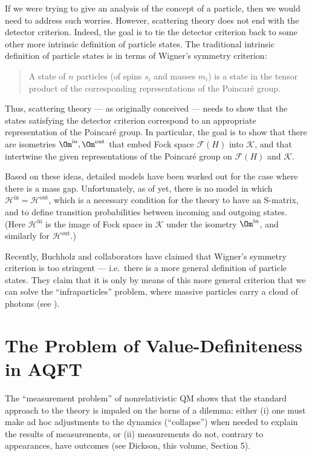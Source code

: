 \documentclass[11pt]{article}
\theoremstyle{definition}
\theoremstyle{definition}
\theoremstyle{remark}
\def\2#1{{\mathcal #1}}
\begin{document}
If we were trying to give an analysis of the concept of a particle,
then we would need to address such worries.  However, scattering
theory does not end with the detector criterion.  Indeed, the goal is
to tie the detector criterion back to some other more intrinsic
definition of particle states.  The traditional intrinsic definition
of particle states is in terms of Wigner's symmetry criterion:
\begin{quote} A state of $n$ particles (of spins $s_i$
  and masses $m_i$) is a state in the tensor product of
  the corresponding representations of the Poincar{\'e}
  group.  \end{quote} Thus, scattering theory --- as
originally conceived --- needs to show that the states
satisfying the detector criterion correspond to an
appropriate representation of the Poincar{\'e} group.
In particular, the goal is to show that there are
isometries $\Om ^{\mathrm{in}},\Om ^{\mathrm{out}}$
that embed Fock space $\2F (H)$ into $\2K$, and that
intertwine the given representations of the
Poincar{\'e} group on $\2F (H)$ and $\2K$.

Based on these ideas, detailed models have been worked
out for the case where there is a mass gap.
Unfortunately, as of yet, there is no model in which
$\2H ^{\mathrm{in}}=\2H ^{\mathrm{out}}$, which is a
necessary condition for the theory to have an S-matrix,
and to define transition probabilities between incoming
and outgoing states.  (Here $\2H ^{\mathrm{in}}$ is the
image of Fock space in $\2K$ under the isometry $\Om
^{\mathrm{in}}$, and similarly for $\2H
^{\mathrm{out}}$.)

Recently, Buchholz and collaborators have claimed that Wigner's
symmetry criterion is too stringent --- i.e.\ there is a more general
definition of particle states.  They claim that it is only by means of
this more general criterion that we can solve the ``infraparticles''
problem, where massive particles carry a cloud of photons (see
\cite{buc-por}).


\bigskip {}


\section{The Problem of Value-Definiteness in AQFT} \label{modal}

The ``measurement problem'' of nonrelativistic QM shows that the
standard approach to the theory is impaled on the horns of a dilemma:
either (i) one must make ad hoc adjustments to the dynamics
(``collapse'') when needed to explain the results of measurements, or
(ii) measurements do not, contrary to appearances, have outcomes (see
Dickson, this volume, Section 5).
\end{document}
